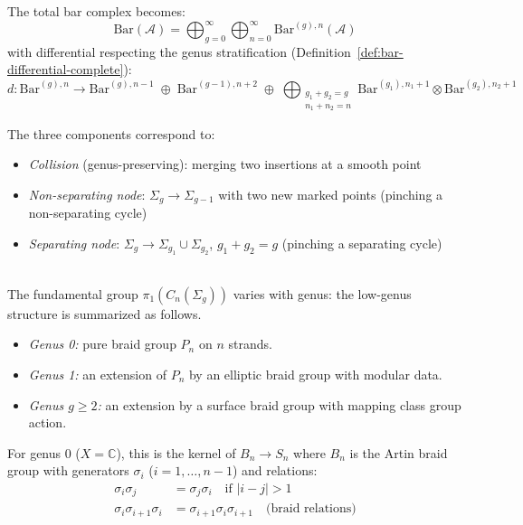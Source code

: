 The total bar complex becomes:
\[\text{Bar}(\mathcal{A}) = \bigoplus_{g=0}^{\infty} \bigoplus_{n=0}^{\infty} \text{Bar}^{(g),n}(\mathcal{A})\]
with differential respecting the genus stratification (Definition~\ref{def:bar-differential-complete}):
\[d: \text{Bar}^{(g),n} \to \text{Bar}^{(g),n-1} \;\oplus\; \text{Bar}^{(g-1),n+2} \;\oplus\; \bigoplus_{\substack{g_1+g_2=g \\ n_1+n_2=n}} \text{Bar}^{(g_1),n_1+1} \otimes \text{Bar}^{(g_2),n_2+1}\]

The three components correspond to:
\begin{itemize}
\item \emph{Collision} (genus-preserving): merging two insertions at a smooth point
\item \emph{Non-separating node}: $\Sigma_g \to \Sigma_{g-1}$ with two new marked points (pinching a non-separating cycle)
\item \emph{Separating node}: $\Sigma_g \to \Sigma_{g_1} \cup \Sigma_{g_2}$, $g_1 + g_2 = g$ (pinching a separating cycle)
\end{itemize}

 
\begin{proposition}
\label{prop:fundamental-group-genera}
\leavevmode\\
The fundamental group $\pi_1(C_n(\Sigma_g))$ varies with genus:
the low-genus structure is summarized as follows.
\begin{itemize}
\item \emph{Genus 0:} pure braid group $P_n$ on $n$ strands.
\item \emph{Genus 1:} an extension of $P_n$ by an elliptic braid group with modular data.
\item \emph{Genus $g \geq 2$:} an extension by a surface braid group with mapping class group action.
\end{itemize}

For genus 0 ($X = \mathbb{C}$), this is the kernel of $B_n \to S_n$ where $B_n$ is the Artin braid group with generators $\sigma_i$ ($i = 1, \ldots, n-1$) and relations:
\begin{align}
\sigma_i\sigma_j &= \sigma_j\sigma_i \quad \text{if } |i-j| > 1 \\
\sigma_i\sigma_{i+1}\sigma_i &= \sigma_{i+1}\sigma_i\sigma_{i+1} \quad \text{(braid relations)}
\end{align}
\end{proposition}
 
